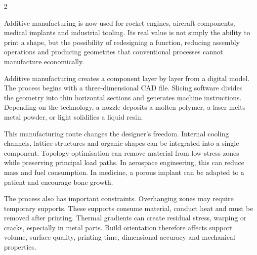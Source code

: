 

\begin{multicols}{2}
\begin{engineeringnews}
Additive manufacturing is now used for rocket engines, aircraft components, medical implants and
industrial tooling. Its real value is not simply the ability to print a shape, but the possibility of
redesigning a function, reducing assembly operations and producing geometries that conventional
processes cannot manufacture economically.
\end{engineeringnews}

\begin{ecarticle}
Additive manufacturing creates a component layer by layer from a digital model. The process begins
with a three-dimensional CAD file. Slicing software divides the geometry into thin horizontal
sections and generates machine instructions. Depending on the technology, a nozzle deposits a
molten polymer, a laser melts metal powder, or light solidifies a liquid resin.

This manufacturing route changes the designer's freedom. Internal cooling channels, lattice
structures and organic shapes can be integrated into a single component. Topology optimisation can
remove material from low-stress zones while preserving principal load paths. In aerospace
engineering, this can reduce mass and fuel consumption. In medicine, a porous implant can be adapted
to a patient and encourage bone growth.

The process also has important constraints. Overhanging zones may require temporary supports. These
supports consume material, conduct heat and must be removed after printing. Thermal gradients can
create residual stress, warping or cracks, especially in metal parts. Build orientation therefore
affects support volume, surface quality, printing time, dimensional accuracy and mechanical
properties.


\end{ecarticle}
\end{multicols}
